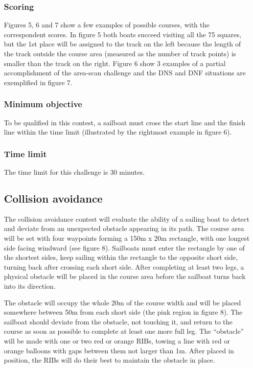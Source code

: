 \documentclass[12pt]{article}
\begin{document}
\subsubsection{Scoring}

Figures 5, 6 and 7 show a few examples of possible courses, with the
correspondent scores. In
figure 5 both boats succeed visiting all the 75 squares, but the 1st place will
be assigned to the
track on the left because the length of the track outside the course area
(measured as the
number of track points) is smaller than the track on the right. Figure 6 show 3
examples of a
partial accomplishment of the area-scan challenge and the DNS and DNF situations
are
exemplified in figure 7.

\subsubsection{Minimum objective}

To be qualified in this contest, a sailboat must cross the start line and the
finish line within
the time limit (illustrated by the rightmost example in figure 6).
\subsubsection{Time limit}
The time limit for this challenge is 30 minutes.
\subsection{Collision avoidance}

The collision avoidance contest will evaluate the ability of a sailing boat to
detect and deviate
from an unexpected obstacle appearing in its path. The course area will be set
with four
waypoints forming a 150m x 20m rectangle, with one longest side facing windward
(see figure
8). Sailboats must enter the rectangle by one of the shortest sides, keep
sailing within the
rectangle to the opposite short side, turning back after crossing each short
side. After
completing at least two legs, a physical obstacle will be placed in the course
area before the
sailboat turns back into its direction.

The obstacle will occupy the whole 20m of the course width and will be placed
somewhere
between 50m from each short side (the pink region in figure 8). The sailboat
should deviate
from the obstacle, not touching it, and return to the course as soon as possible
to complete at
least one more full leg. The “obstacle” will be made with one or two red or
orange RIBs, towing
a line with red or orange balloons with gaps between them not larger than 1m.
After placed in
position, the RIBs will do their best to maintain the obstacle in place.
\end{document}
